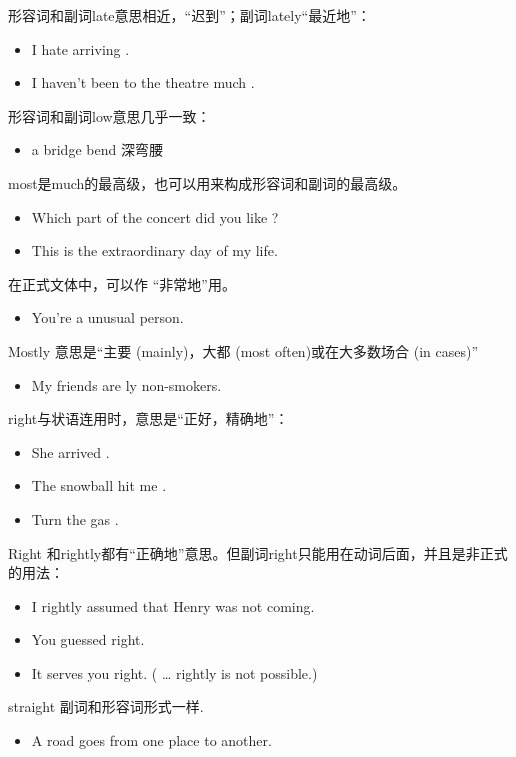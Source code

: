 形容词和副词late意思相近，“迟到”；副词lately“最近地”：
\begin{itemize}
\item I hate arriving .

\item I haven't been to the theatre much .
\end{itemize}

形容词和副词low意思几乎一致：
\begin{itemize}
\item a  bridge \qquad bend  深弯腰
\end{itemize}

most是much的最高级，也可以用来构成形容词和副词的最高级。
\begin{itemize}
\item Which part of the concert did you like ?
\item This is the  extraordinary day of my life.
\end{itemize}
在正式文体中，可以作
“非常地”用。
\begin{itemize}
\item You're a  unusual person.
\end{itemize}
Mostly 意思是“主要 (mainly)，大都 (most often)或在大多数场合 (in  cases)”
\begin{itemize}
\item My friends are ly non-smokers.
\end{itemize}


right与状语连用时，意思是“正好，精确地”：
\begin{itemize}
\item She arrived  .
\item The snowball hit me  .
\item Turn the gas  .
\end{itemize}
Right 和rightly都有“正确地”意思。但副词right只能用在动词后面，并且是非正式
的用法：
\begin{itemize}
\item I rightly assumed that Henry was not coming.
\item You guessed right.
\item It serves you right. ( … rightly is not possible.)
\end{itemize}

straight 副词和形容词形式一样.
\begin{itemize}
\item A  road goes  from one place to another.
\end{itemize}

